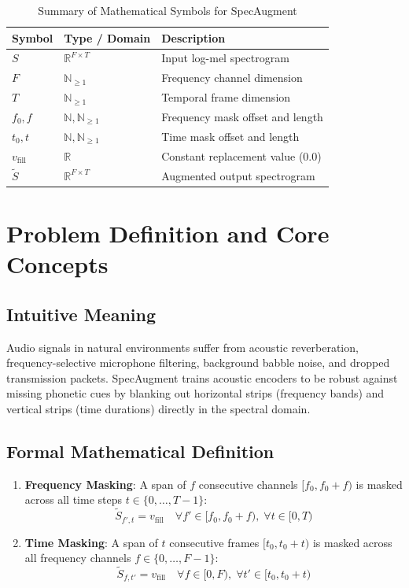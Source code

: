 \documentclass[11pt,a4paper]{article}
\theoremstyle{definition}
\begin{document}
\begin{table}[h]
\centering
\caption{Summary of Mathematical Symbols for SpecAugment}
\begin{tabular}{lll}
\toprule
\textbf{Symbol} & \textbf{Type / Domain} & \textbf{Description} \\
\midrule
$S$ & $\mathbb{R}^{F \times T}$ & Input log-mel spectrogram \\
$F$ & $\mathbb{N}_{\ge 1}$ & Frequency channel dimension \\
$T$ & $\mathbb{N}_{\ge 1}$ & Temporal frame dimension \\
$f_0, f$ & $\mathbb{N}, \mathbb{N}_{\ge 1}$ & Frequency mask offset and length \\
$t_0, t$ & $\mathbb{N}, \mathbb{N}_{\ge 1}$ & Time mask offset and length \\
$v_{\text{fill}}$ & $\mathbb{R}$ & Constant replacement value ($0.0$) \\
$\tilde{S}$ & $\mathbb{R}^{F \times T}$ & Augmented output spectrogram \\
\bottomrule
\end{tabular}
\end{table}

\section{Problem Definition and Core Concepts}

\subsection{Intuitive Meaning}
Audio signals in natural environments suffer from acoustic reverberation, frequency-selective microphone filtering, background babble noise, and dropped transmission packets. SpecAugment trains acoustic encoders to be robust against missing phonetic cues by blanking out horizontal strips (frequency bands) and vertical strips (time durations) directly in the spectral domain.

\subsection{Formal Mathematical Definition}
\begin{enumerate}
    \item \textbf{Frequency Masking}: A span of $f$ consecutive channels $[f_0, f_0 + f)$ is masked across all time steps $t \in \{0, \dots, T-1\}$:
    \begin{equation}
    \tilde{S}_{f', t} = v_{\text{fill}} \quad \forall f' \in [f_0, f_0 + f), \; \forall t \in [0, T)
    \end{equation}
    \item \textbf{Time Masking}: A span of $t$ consecutive frames $[t_0, t_0 + t)$ is masked across all frequency channels $f \in \{0, \dots, F-1\}$:
    \begin{equation}
    \tilde{S}_{f, t'} = v_{\text{fill}} \quad \forall f \in [0, F), \; \forall t' \in [t_0, t_0 + t)
    \end{equation}
\end{enumerate}
\end{document}
